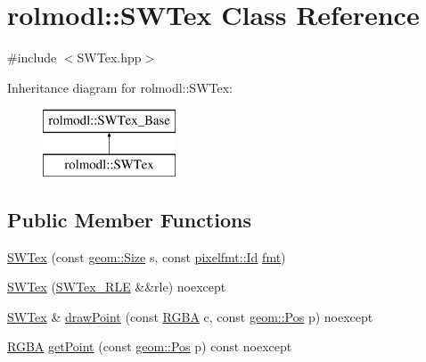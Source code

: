 \hypertarget{classrolmodl_1_1_s_w_tex}{}\section{rolmodl\+::S\+W\+Tex Class Reference}
\label{classrolmodl_1_1_s_w_tex}


{\ttfamily \#include $<$S\+W\+Tex.\+hpp$>$}

Inheritance diagram for rolmodl\+::S\+W\+Tex\+:\begin{figure}[H]
\begin{center}
\leavevmode
\includegraphics[height=2.000000cm]{classrolmodl_1_1_s_w_tex}
\end{center}
\end{figure}
\subsection*{Public Member Functions}
\begin{DoxyCompactItemize}
\item 
\mbox{\hyperlink{classrolmodl_1_1_s_w_tex_afd16b16231887a2755c911c0148ae9d3}{S\+W\+Tex}} (const \mbox{\hyperlink{structrolmodl_1_1geom_1_1_size}{geom\+::\+Size}} s, const \mbox{\hyperlink{namespacerolmodl_1_1pixelfmt_a96282713e4465ba9211c8fd3a702b52b}{pixelfmt\+::\+Id}} \mbox{\hyperlink{classrolmodl_1_1_s_w_tex___base_a71436a7fc7e3be9c94d55e772ceb25fa}{fmt}})
\item 
\mbox{\hyperlink{classrolmodl_1_1_s_w_tex_a1e0e27ed5ac96783de7076e351d92806}{S\+W\+Tex}} (\mbox{\hyperlink{classrolmodl_1_1_s_w_tex___r_l_e}{S\+W\+Tex\+\_\+\+R\+LE}} \&\&rle) noexcept
\item 
\mbox{\hyperlink{classrolmodl_1_1_s_w_tex}{S\+W\+Tex}} \& \mbox{\hyperlink{classrolmodl_1_1_s_w_tex_abdd47f609baa71927b3d18ed673b68d5}{draw\+Point}} (const \mbox{\hyperlink{structrolmodl_1_1_r_g_b_a}{R\+G\+BA}} c, const \mbox{\hyperlink{structrolmodl_1_1geom_1_1_pos}{geom\+::\+Pos}} p) noexcept
\item 
\mbox{\hyperlink{structrolmodl_1_1_r_g_b_a}{R\+G\+BA}} \mbox{\hyperlink{classrolmodl_1_1_s_w_tex_ac0f74d111d9588d1ddfa76ace706967e}{get\+Point}} (const \mbox{\hyperlink{structrolmodl_1_1geom_1_1_pos}{geom\+::\+Pos}} p) const noexcept
\end{DoxyCompactItemize}
